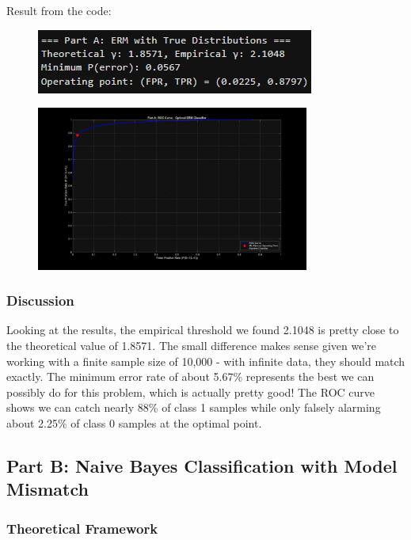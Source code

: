 \documentclass[12pt]{article}
\begin{document}
Result from the code:
\begin{figure}[H]
    \centering
    \includegraphics[width=0.5\linewidth]{resultA.png}
\end{figure}

\begin{figure}[H]
    \centering
    \includegraphics[width=0.8\textwidth]{partA_ROC.png}
\end{figure}

\subsubsection{Discussion}
Looking at the results, the empirical threshold we found 2.1048 is pretty close to the theoretical value of 1.8571. The small difference makes sense given we're working with a finite sample size of 10,000 - with infinite data, they should match exactly. The minimum error rate of about 5.67\% represents the best we can possibly do for this problem, which is actually pretty good! The ROC curve shows we can catch nearly 88\% of class 1 samples while only falsely alarming about 2.25\% of class 0 samples at the optimal point.


\subsection{Part B: Naive Bayes Classification with Model Mismatch}
\subsubsection{Theoretical Framework}
\end{document}
